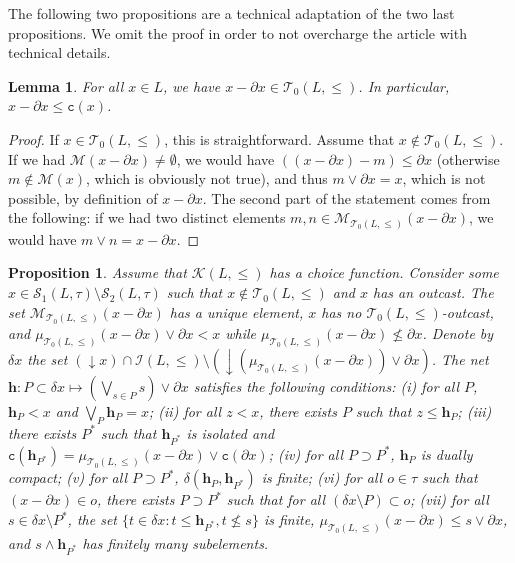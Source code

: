 \documentclass{article}
\newtheorem{lemma}[theorem]{Lemma}
\newtheorem{proposition}[theorem]{Proposition}
\begin{document}
The following two propositions are a technical adaptation of the two last propositions. We omit the proof in order to not overcharge the article with technical details. 

\begin{lemma}\label{coheyting.in.T0}
    For all $x \in L$, we have $x - \partial x \in \mathcal{T}_0(L,\le)$. In particular, $x - \partial x \le \texttt{c}(x)$. 
\end{lemma}

\begin{proof}
    If $x \in \mathcal{T}_0(L,\le)$, this is straightforward.
    Assume that $x \notin \mathcal{T}_0(L,\le)$.
    If we had $\mathcal{M}(x-\partial x) \neq \emptyset$, 
    we would have $((x-\partial x) - m) \le \partial x$ (otherwise $m \notin \mathcal{M}(x)$, which is obviously not true), 
    and thus $m \vee \partial x = x$, which is not possible, by definition of $x - \partial x$. The second part of the statement comes from the following: if we had two distinct elements $m,n \in \mathcal{M}_{\mathcal{T}_0(L,\le)}(x-\partial x)$, 
    we would have $m \vee n = x - \partial x$. 
\end{proof}

\begin{proposition}\label{proposition.isolated.below.nont0.direct}
    Assume that $\mathcal{K}(L,\le)$ has a choice function. Consider some $x \in \mathcal{S}_1(L,\tau) \setminus \mathcal{S}_2(L,\tau)$ such that $x \notin \mathcal{T}_0(L,\le)$ and $x$ has an outcast. The set $\mathcal{M}_{\mathcal{T}_0(L,\le)}(x-\partial x)$ has a unique element, $x$ has no $\mathcal{T}_0(L,\le)$-outcast, 
    and $\mu_{\mathcal{T}_0(L,\le)}(x-\partial x) \vee \partial x < x$ while $\mu_{\mathcal{T}_0(L,\le)}(x-\partial x) \not \le \partial x$.
    Denote by $\delta x$ the set $(\mathop{\downarrow}x) \cap \mathcal{I}(L,\le) \setminus (\mathop{\downarrow} (\mu_{\mathcal{T}_0(L,\le)}(x-\partial x))\vee \partial x)$. The net $\boldsymbol{h} : P \subset \delta x \mapsto \left(\bigvee_{s \in P} s\right) \vee \partial x$ satisfies the following conditions: 
    (i) for all $P$, $\boldsymbol{h}_P < x$ and $\bigvee_{P} \boldsymbol{h}_P = x$; 
    (ii) for all $z < x$, there exists $P$ such that $z \le \boldsymbol{h}_P$; (iii) there exists $P^*$ such that $\boldsymbol{h}_{P^*}$ is isolated and $\texttt{c}(\boldsymbol{h}_{P^*}) = \mu_{\mathcal{T}_0(L,\le)}(x-\partial x) \vee \texttt{c}(\partial x)$; (iv) for all $P \supset P^*$, $\boldsymbol{h}_P$ is dually compact; 
    (v) for all $P \supset P^*$, 
    $\delta(\boldsymbol{h}_P,\boldsymbol{h}_{P^*})$ is finite; (vi) for all $o \in \tau$ such that $(x-\partial x) \in o$, there exists $P \supset P^*$ such that for all $(\delta x \setminus P) \subset o$; (vii) for all $s \in \delta x \setminus P^*$, 
    the set $\{t \in \delta x : t \le \boldsymbol{h}_{P^*}, t \not \le s\}$ is finite, $\mu_{\mathcal{T}_0(L,\le)}(x-\partial x) \le s \vee \partial x$, and $s \wedge \boldsymbol{h}_{P^*}$ has finitely many subelements.
\end{proposition}
\end{document}
